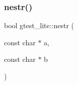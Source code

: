 \mbox{\label{namespacegtest__lite_a0a34b1bb0d55bc0c6a3e878ec2bcd49f}} 
\subsubsection{\texorpdfstring{nestr()}{nestr()}}
{\footnotesize\ttfamily bool gtest\+\_\+lite\+::nestr (\begin{DoxyParamCaption}\item[{const char $\ast$}]{a,  }\item[{const char $\ast$}]{b }\end{DoxyParamCaption})\hspace{0.3cm}{\ttfamily [inline]}}


